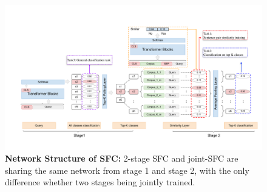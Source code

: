\begin{figure}[t]
  \begin{centering}
    \includegraphics[scale=0.66]{picture/picture4} 
    \par
  \end{centering}
  \caption{
    \textbf{Network Structure of SFC:} 2-stage SFC and joint-SFC are sharing
    the same network from stage 1 and stage 2, with the only difference
    whether two stages being jointly trained.
  }
  \label{fig:framework}
\end{figure}

